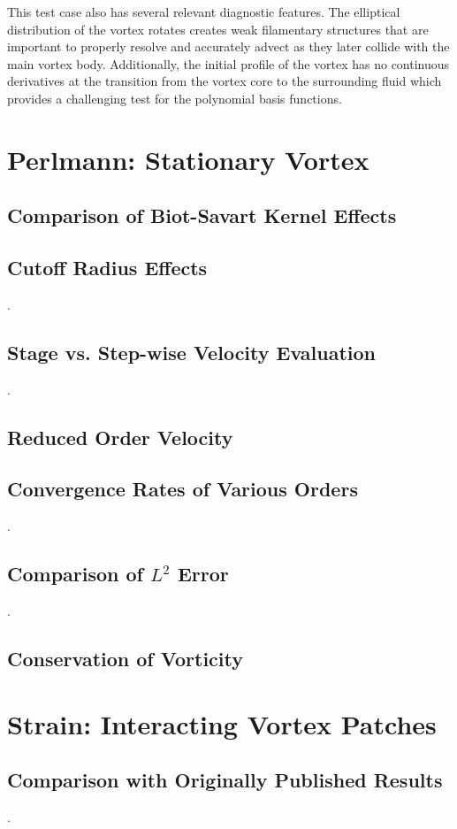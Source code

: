 \documentclass[letterpaper,12pt]{report}
\begin{document}
This test case also has several relevant diagnostic features. The elliptical distribution of the vortex rotates creates weak filamentary structures that are important to properly resolve and accurately advect as they later collide with the main vortex body. Additionally, the initial profile of the vortex has no continuous derivatives at the transition from the vortex core to the surrounding fluid which provides a challenging test for the polynomial basis functions.
\newpage
%
\section{Perlmann: Stationary Vortex}
\subsection{Comparison of Biot-Savart Kernel Effects}
\newpage
\subsection{Cutoff Radius Effects}
\newpage.
\newpage
\subsection{Stage vs. Step-wise Velocity Evaluation}
\newpage.
\newpage
\subsection{Reduced Order Velocity}
\newpage
\subsection{Convergence Rates of Various Orders}
\newpage.
\newpage
\subsection{Comparison of $L^2$ Error}
\newpage.
\newpage
\subsection{Conservation of Vorticity}
\newpage

%
\section{Strain: Interacting Vortex Patches}
\subsection{Comparison with Originally Published Results}
\newpage.
\newpage
\end{document}
